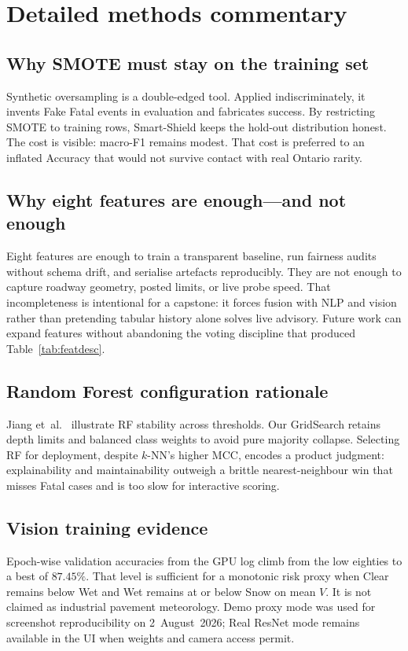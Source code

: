 \documentclass[11pt,a4paper]{article}
\begin{document}
\newpage
\section*{Detailed methods commentary}
\label{sec:methodext}

\subsection{Why SMOTE must stay on the training set}
Synthetic oversampling is a double-edged tool. Applied indiscriminately, it invents Fake Fatal events in evaluation and fabricates success. By restricting SMOTE to training rows, Smart-Shield keeps the hold-out distribution honest. The cost is visible: macro-F1 remains modest. That cost is preferred to an inflated Accuracy that would not survive contact with real Ontario rarity.

\subsection{Why eight features are enough---and not enough}
Eight features are enough to train a transparent baseline, run fairness audits without schema drift, and serialise artefacts reproducibly. They are not enough to capture roadway geometry, posted limits, or live probe speed. That incompleteness is intentional for a capstone: it forces fusion with NLP and vision rather than pretending tabular history alone solves live advisory. Future work can expand features without abandoning the voting discipline that produced Table~\ref{tab:featdesc}.

\subsection{Random Forest configuration rationale}
Jiang et~al.~\citep{jiang2024traffic} illustrate RF stability across thresholds. Our GridSearch retains depth limits and balanced class weights to avoid pure majority collapse. Selecting RF for deployment, despite $k$-NN's higher MCC, encodes a product judgment: explainability and maintainability outweigh a brittle nearest-neighbour win that misses Fatal cases and is too slow for interactive scoring.

\subsection{Vision training evidence}
Epoch-wise validation accuracies from the GPU log climb from the low eighties to a best of $87.45\%$. That level is sufficient for a monotonic risk proxy when Clear remains below Wet and Wet remains at or below Snow on mean $V$. It is not claimed as industrial pavement meteorology. Demo proxy mode was used for screenshot reproducibility on 2~August~2026; Real ResNet mode remains available in the UI when weights and camera access permit.
\end{document}
